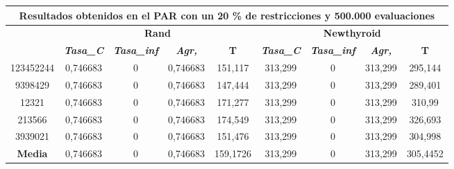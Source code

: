 \documentclass[12pt, spanish]{article}
\begin{document}
\begin{table}[H]
\begin{tabular}{|c|c|c|c|c|c|c|c|c|}
\hline
\multicolumn{9}{|c|}{\textbf{Resultados obtenidos en el PAR con un 20 \% de restricciones y 500.000 evaluaciones}}                                                                                                \\ \hline
\multirow{2}{*}{} & \multicolumn{4}{c|}{\textbf{Rand}}                                                            & \multicolumn{4}{c|}{\textbf{Newthyroid}}                                                      \\ \cline{2-9} 
                  & \textit{\textbf{Tasa\_C}} & \textit{\textbf{Tasa\_inf}} & \textit{\textbf{Agr,}} & \textbf{T} & \textit{\textbf{Tasa\_C}} & \textit{\textbf{Tasa\_inf}} & \textit{\textbf{Agr,}} & \textbf{T} \\ \hline
123452244         & 0,746683                  & 0                           & 0,746683               & 151,117    & 313,299                   & 0                           & 313,299                & 295,144    \\ \hline
9398429           & 0,746683                  & 0                           & 0,746683               & 147,444    & 313,299                   & 0                           & 313,299                & 289,401    \\ \hline
12321             & 0,746683                  & 0                           & 0,746683               & 171,277    & 313,299                   & 0                           & 313,299                & 310,99     \\ \hline
213566            & 0,746683                  & 0                           & 0,746683               & 174,549    & 313,299                   & 0                           & 313,299                & 326,693    \\ \hline
3939021           & 0,746683                  & 0                           & 0,746683               & 151,476    & 313,299                   & 0                           & 313,299                & 304,998    \\ \hline
\textbf{Media}    & 0,746683                  & 0                           & 0,746683               & 159,1726   & 313,299                   & 0                           & 313,299                & 305,4452   \\ \hline
\end{tabular}
\end{table}
\end{document}

